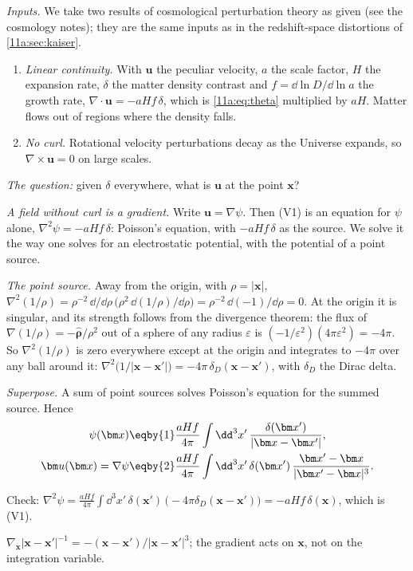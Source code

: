 \emph{Inputs.} We take two results of cosmological perturbation theory as given
(see the cosmology notes); they are the same inputs as in the redshift-space
distortions of \cref{11a:sec:kaiser}.
\begin{enumerate}[label=(V\arabic*),leftmargin=2.6em,itemsep=1pt]
  \item \emph{Linear continuity.} With $\bm u$ the peculiar velocity, $a$ the scale
        factor, $H$ the expansion rate, $\delta$ the matter density contrast and
        $f=\dd\ln D/\dd\ln a$ the growth rate,
        $\nabla\cdot\bm u=-aHf\,\delta$, which is \eqref{11a:eq:theta} multiplied by
        $aH$. Matter flows out of regions where the density falls.
  \item \emph{No curl.} Rotational velocity perturbations decay as the Universe
        expands, so $\nabla\times\bm u=0$ on large scales.
\end{enumerate}
\emph{The question:} given $\delta$ everywhere, what is $\bm u$ at the point $\bm x$?

\emph{A field without curl is a gradient.} Write $\bm u=\nabla\psi$. Then (V1) is an
equation for $\psi$ alone, $\nabla^2\psi=-aHf\,\delta$: Poisson's equation, with
$-aHf\,\delta$ as the source. We solve it the way one solves for an electrostatic
potential, with the potential of a point source.

\emph{The point source.} Away from the origin, with $\rho=|\bm x|$,
$\nabla^2(1/\rho)=\rho^{-2}\,\dd/\dd\rho\,\bigl(\rho^2\,\dd(1/\rho)/\dd\rho\bigr)
=\rho^{-2}\,\dd(-1)/\dd\rho=0$. At the origin it is singular, and its strength
follows from the divergence theorem: the flux of $\nabla(1/\rho)=-\hat{\bm\rho}/\rho^2$
out of a sphere of any radius $\varepsilon$ is $(-1/\varepsilon^2)(4\pi\varepsilon^2)=-4\pi$.
So $\nabla^2(1/\rho)$ is zero everywhere except at the origin and integrates to
$-4\pi$ over any ball around it:
$\nabla^2\bigl(1/|\bm x-\bm x'|\bigr)=-4\pi\,\delta_D(\bm x-\bm x')$, with $\delta_D$ the
Dirac delta.

\emph{Superpose.} A sum of point sources solves Poisson's equation for the summed
source. Hence
\begin{align}
  \psi(\bm x)
  &\eqby{1}\frac{aHf}{4\pi}\int\dd^3x'\,\frac{\delta(\bm x')}{|\bm x-\bm x'|},
  \nonumber\\
  \bm u(\bm x)=\nabla\psi
  &\eqby{2}\frac{aHf}{4\pi}\int\dd^3x'\,\delta(\bm x')\,
   \frac{\bm x'-\bm x}{|\bm x'-\bm x|^3}.
  \label{11c:eq:u-integral}
\end{align}
\begin{explain}
  \item Check: $\nabla^2\psi=\frac{aHf}{4\pi}\int\dd^3x'\,\delta(\bm x')\,
        \bigl(-4\pi\delta_D(\bm x-\bm x')\bigr)=-aHf\,\delta(\bm x)$, which is (V1).
  \item $\nabla_{\bm x}|\bm x-\bm x'|^{-1}=-(\bm x-\bm x')/|\bm x-\bm x'|^3$; the
        gradient acts on $\bm x$, not on the integration variable.
\end{explain}

